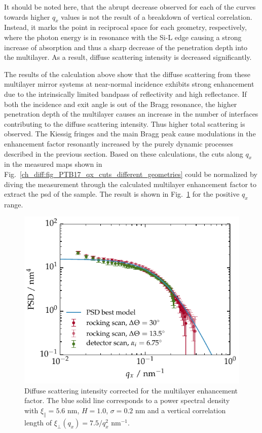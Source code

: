 It should be noted here, that the abrupt decrease observed for each of the curves towards higher $q_x$ values is not the result of a breakdown of vertical correlation. Instead, it marks the point in reciprocal space for each geometry, respectively, where the photon energy is in resonance with the Si-L edge causing a strong increase of absorption and thus a sharp decrease of the penetration depth into the multilayer. As a result, diffuse scattering intensity is decreased significantly.

The results of the calculation above show that the diffuse scattering from these multilayer mirror systems at near-normal incidence exhibits strong enhancement due to the intrinsically limited bandpass of reflectivity and high reflectance. If both the incidence and exit angle is out of the Bragg resonance, the higher penetration depth of the multilayer causes an increase in the number of interfaces contributing to the diffuse scattering intensity. Thus higher total scattering is observed. The Kiessig fringes and the main Bragg peak cause modulations in the enhancement factor resonantly increased by the purely dynamic processes described in the previous section. Based on these calculations, the cuts along $q_x$ in the measured maps shown in Fig.~\ref{ch_diff:fig_PTB17_qx_cuts_different_geometries} could be normalized by diving the measurement through the calculated multilayer enhancement factor to extract the \gls{psd} of the sample. The result is shown in Fig.~\ref{ch_diff:PTB17_PSD_for_all_geometries} for the positive $q_x$ range.
\begin{figure}[htbp]
	\includegraphics{img/PTB17_PSD_for_all_geometries} \caption[Diffuse scattering intensity corrected for the multilayer enhancement factor.]{Diffuse scattering intensity corrected for the multilayer enhancement factor. The blue solid line corresponds to a power spectral density with $\xi_\parallel=5.6$ nm, $H=1.0$, $\sigma=0.2$ nm and a vertical correlation length of $\xi_\perp(q_x)=7.5/q_x^2$ nm$^{-1}$.} \label{ch_diff:PTB17_PSD_for_all_geometries} 
\end{figure}
